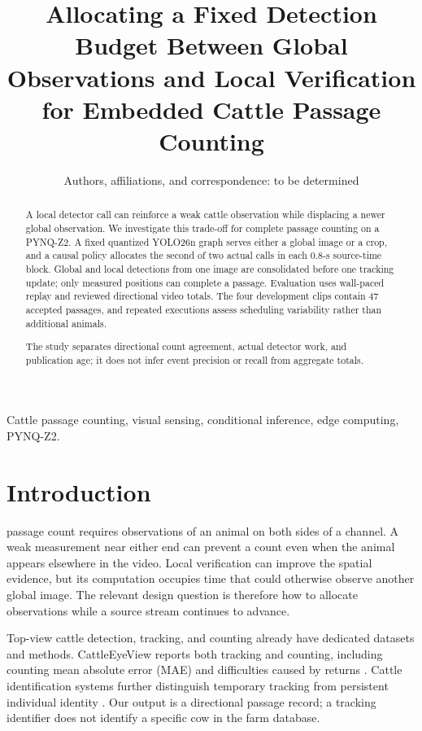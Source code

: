 \documentclass[journal]{IEEEtran}
\title{Allocating a Fixed Detection Budget Between Global Observations and Local Verification for Embedded Cattle Passage Counting}
\author{Authors, affiliations, and correspondence: to be determined}
\begin{document}
\maketitle
\begin{abstract}
A local detector call can reinforce a weak cattle observation while displacing a newer global observation. We investigate this trade-off for complete passage counting on a PYNQ-Z2. A fixed quantized YOLO26n graph serves either a global image or a crop, and a causal policy allocates the second of two actual calls in each 0.8-s source-time block. Global and local detections from one image are consolidated before one tracking update; only measured positions can complete a passage. Evaluation uses wall-paced replay and reviewed directional video totals. The four development clips contain 47 accepted passages, and repeated executions assess scheduling variability rather than additional animals.


The study separates directional count agreement, actual detector work, and publication age; it does not infer event precision or recall from aggregate totals.
\end{abstract}
\begin{IEEEkeywords}
Cattle passage counting, visual sensing, conditional inference, edge computing, PYNQ-Z2.
\end{IEEEkeywords}

\section{Introduction}
 passage count requires observations of an animal on both sides of a channel. A weak measurement near either end can prevent a count even when the animal appears elsewhere in the video. Local verification can improve the spatial evidence, but its computation occupies time that could otherwise observe another global image. The relevant design question is therefore how to allocate observations while a source stream continues to advance.

Top-view cattle detection, tracking, and counting already have dedicated datasets and methods. CattleEyeView reports both tracking and counting, including counting mean absolute error (MAE) and difficulties caused by returns \cite{cattleeyeview}. Cattle identification systems further distinguish temporary tracking from persistent individual identity \cite{cattle_id_2024}. Our output is a directional passage record; a tracking identifier does not identify a specific cow in the farm database.
\end{document}
